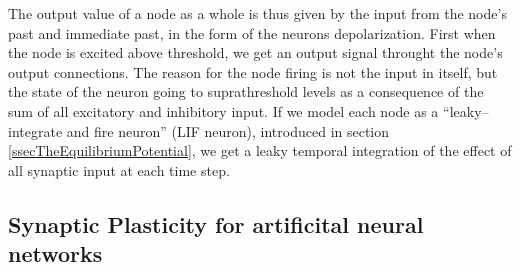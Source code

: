 The output value of a node as a whole is thus given by the input from the node's past and immediate past, in the form of the neurons depolarization.
First when the node is excited above threshold, we get an output signal throught the node's output connections.
The reason for the node firing is not the input in itself, but the state of the neuron going to suprathreshold levels as a consequence of the sum of all excitatory and inhibitory input.
If we model each node as a ``leaky--integrate and fire neuron'' (LIF neuron), introduced in section \ref{ssecTheEquilibriumPotential}, we get a leaky temporal integration of the effect of all synaptic input at each time step.
%









\subsection{Synaptic Plasticity for artificital neural networks}


